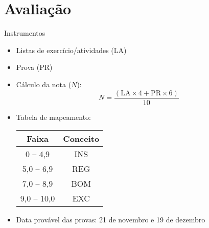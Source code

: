    \section[ slide = true ]{Avaliação}
      \begin{slide}[toc=]{Instrumentos}
         \begin{itemize}
            \item Listas de exercício/atividades (LA)
            \item Prova (PR)
            \item Cálculo da nota ($N$):
            \begin{equation*}
               N=\frac{( \text{LA} \times 4+ \text{PR} \times 6 )} {10}
            \end{equation*}
            \item Tabela de mapeamento:
            \begin{table}
               \centering
               \begin{tabular}{c|c}
                  \hline%
                  \textbf{Faixa} & \textbf{Conceito}\\
                  \hline
                  0 -- 4,9 & INS\\
                  5,0 -- 6,9 & REG\\
                  7,0 -- 8,9 & BOM\\
                  9,0 -- 10,0 & EXC\\
                  \hline%
               \end{tabular}
            \end{table}    
            \item Data provável das provas: 21 de novembro e 19 de dezembro
           \end{itemize}
      \end{slide}
%      
